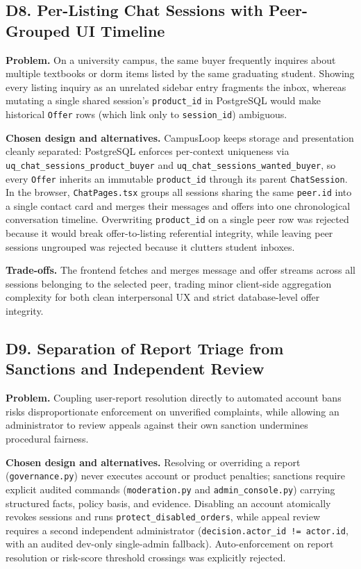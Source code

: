 \subsection{D8. Per-Listing Chat Sessions with Peer-Grouped UI Timeline}

\textbf{Problem.} On a university campus, the same buyer frequently inquires about multiple textbooks or dorm items listed by the same graduating student. Showing every listing inquiry as an unrelated sidebar entry fragments the inbox, whereas mutating a single shared session's \texttt{product\_id} in PostgreSQL would make historical \texttt{Offer} rows (which link only to \texttt{session\_id}) ambiguous.

\textbf{Chosen design and alternatives.} CampusLoop keeps storage and presentation cleanly separated: PostgreSQL enforces per-context uniqueness via \texttt{uq\_chat\_sessions\_product\_buyer} and \texttt{uq\_chat\_sessions\_wanted\_buyer}, so every \texttt{Offer} inherits an immutable \texttt{product\_id} through its parent \texttt{ChatSession}. In the browser, \texttt{ChatPages.tsx} groups all sessions sharing the same \texttt{peer.id} into a single contact card and merges their messages and offers into one chronological conversation timeline. Overwriting \texttt{product\_id} on a single peer row was rejected because it would break offer-to-listing referential integrity, while leaving peer sessions ungrouped was rejected because it clutters student inboxes.

\textbf{Trade-offs.} The frontend fetches and merges message and offer streams across all sessions belonging to the selected peer, trading minor client-side aggregation complexity for both clean interpersonal UX and strict database-level offer integrity.

\subsection{D9. Separation of Report Triage from Sanctions and Independent Review}

\textbf{Problem.} Coupling user-report resolution directly to automated account bans risks disproportionate enforcement on unverified complaints, while allowing an administrator to review appeals against their own sanction undermines procedural fairness.

\textbf{Chosen design and alternatives.} Resolving or overriding a report (\texttt{governance.py}) never executes account or product penalties; sanctions require explicit audited commands (\texttt{moderation.py} and \texttt{admin\_console.py}) carrying structured facts, policy basis, and evidence. Disabling an account atomically revokes sessions and runs \texttt{protect\_disabled\_orders}, while appeal review requires a second independent administrator (\texttt{decision.actor\_id != actor.id}, with an audited dev-only single-admin fallback). Auto-enforcement on report resolution or risk-score threshold crossings was explicitly rejected.

